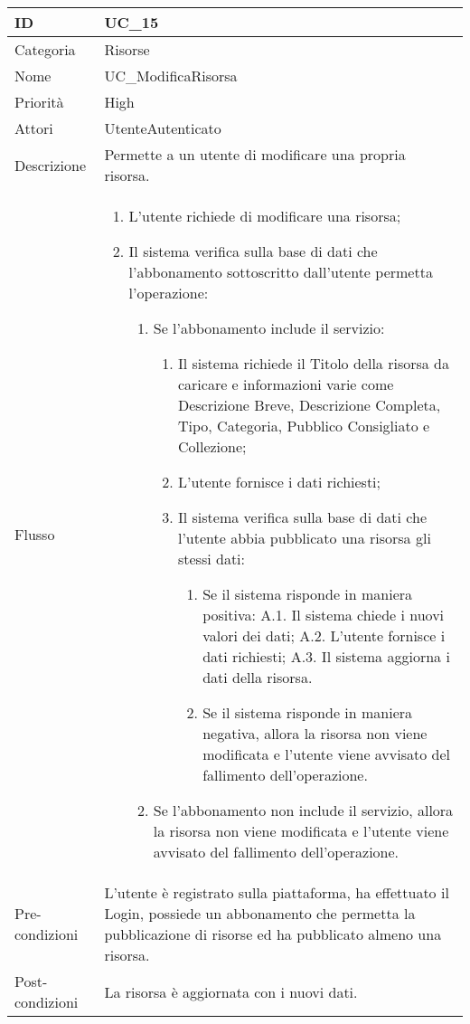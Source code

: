 \begin{center}
\begin{tabular}{ |p{2cm}|p{13cm}|  }
\hline
ID & UC\_15 \\\hline
Categoria & Risorse\\\hline
Nome & UC\_ModificaRisorsa\\\hline
Priorità & High \\\hline
Attori &  UtenteAutenticato \\\hline
Descrizione & Permette a un utente di modificare una propria risorsa.\\\hline
Flusso &  	\begin{enumerate}
			\item L'utente richiede di modificare una risorsa;
			\item Il sistema verifica sulla base di dati che l'abbonamento sottoscritto dall'utente permetta l'operazione:
			\begin{enumerate}
				\item Se l'abbonamento include il servizio:
				\begin{enumerate}
					\item Il sistema richiede il Titolo della risorsa da caricare e informazioni varie come Descrizione Breve,  Descrizione Completa, Tipo, Categoria, Pubblico Consigliato e Collezione;
					\item L'utente fornisce i dati richiesti;
					\item Il sistema verifica sulla base di dati che l'utente abbia pubblicato una risorsa gli stessi dati:
					\begin{enumerate}
						\item Se il sistema risponde in maniera positiva:
							\subitem A.1. Il sistema chiede i nuovi valori dei dati;
							\subitem A.2. L'utente fornisce i dati richiesti;
							\subitem A.3. Il sistema aggiorna i dati della risorsa.
						\item Se il sistema risponde in maniera negativa, allora  la risorsa non viene modificata e l'utente viene avvisato del fallimento dell'operazione.
					\end{enumerate}
				\end{enumerate}
				\item Se l'abbonamento non include il servizio, allora la risorsa non viene modificata e l'utente viene avvisato del fallimento dell'operazione.
			\end{enumerate}
		\end{enumerate}\\\hline
Pre-condizioni & L'utente è registrato sulla piattaforma, ha effettuato il Login, possiede un abbonamento che permetta la pubblicazione di risorse ed ha pubblicato almeno una risorsa.\\\hline
Post-condizioni & La risorsa è aggiornata con i nuovi dati.\\\hline
\end{tabular}
\label{table_use_case:15}\newline





\end{center}